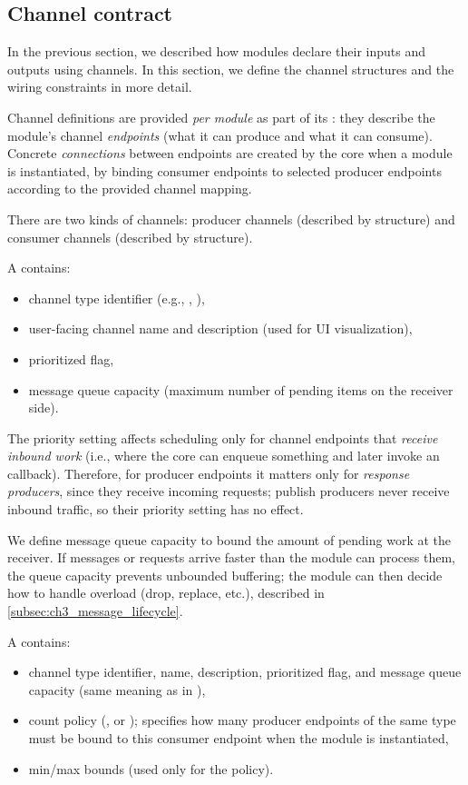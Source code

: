 \subsection{Channel contract} \label{subsec:ch3_channel_contract}

In the previous section, we described how modules declare their inputs and outputs using channels. In this section, we define the channel structures and the wiring constraints in more detail.

Channel definitions are provided \emph{per module} as part of its : they describe the module's channel \emph{endpoints} (what it can produce and what it can consume). Concrete \emph{connections} between endpoints are created by the core when a module is instantiated, by binding consumer endpoints to selected producer endpoints according to the provided channel mapping.

There are two kinds of channels: producer channels (described by  structure) and consumer channels (described by  structure).

A  contains:
\begin{itemize}
    \item channel type identifier (e.g., , ),
    \item user-facing channel name and description (used for UI visualization),
    \item prioritized flag,
    \item message queue capacity (maximum number of pending items on the receiver side).
\end{itemize}

The priority setting affects scheduling only for channel endpoints that \emph{receive inbound work} (i.e., where the core can enqueue something and later invoke an  callback). Therefore, for producer endpoints it matters only for \emph{response producers}, since they receive incoming requests; publish producers never receive inbound traffic, so their priority setting has no effect.

We define message queue capacity to bound the amount of pending work at the receiver. If messages or requests arrive faster than the module can process them, the queue capacity prevents unbounded buffering; the module can then decide how to handle overload (drop, replace, etc.), described in \autoref{subsec:ch3_message_lifecycle}.

A  contains:
\begin{itemize}
    \item channel type identifier, name, description, prioritized flag, and message queue capacity (same meaning as in ),
    \item count policy (,  or ); specifies how many producer endpoints of the same type must be bound to this consumer endpoint when the module is instantiated,
    \item min/max bounds (used only for the  policy).
\end{itemize}

